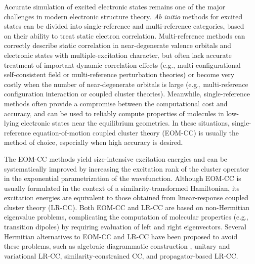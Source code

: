 Accurate simulation of excited electronic states remains one of the major
challenges in modern electronic structure theory. 
{\it Ab initio}\/ methods for excited states can be divided into
single-reference and multi-reference categories, based on their ability to
treat static electron correlation.
Multi-reference methods can correctly describe static correlation in
near-degenerate valence orbitals and electronic states with multiple-excitation
character, but often lack accurate treatment of important dynamic correlation
effects (e.g., multi-configurational self-consistent field or multi-reference
perturbation theories)
\cite{Knowles:1985p259,Werner:1985p5053,Wolinski:1987p225,Hirao:1992p374,Finley:1998p299,Andersson:1990p5483,Andersson:1992p1218,Werner:1996p645,Angeli:2001p10252,Angeli:2001p297}
or become very costly when the number of near-degenerate orbitals is large
(e.g., multi-reference configuration interaction or coupled cluster theories).
\cite{Mukherjee:1977p955,Lindgren:1978p33,Siegbahn:1980p1647,Jeziorski:1981p1668,Werner:1988p5803,Mahapatra:1998p157,Mahapatra:1999p6171,Pittner:2003p10876,Evangelista:2007p024102,Datta:2011p214116,Evangelista:2011p114102,Kohn:2013p176,Nooijen:2014p081102}
Meanwhile,
single-reference methods
\cite{Foresman:1992p135,Sherrill:1999p143,Geertsen:1989p57,Comeau:1993p414,Stanton:1993p7029,Krylov:2008p433,Crawford:2000p33,Shavitt:2009,Sekino:1984p255,Koch:1990p3345,Koch:1990p3333,Nooijen:1997p6441,Nooijen:1997p6812,Nakatsuji:1978p2053,Nakatsuji:1979p329}
often provide a compromise between the computational
cost and accuracy, and can be used to reliably compute properties of molecules
in low-lying electronic states near the equilibrium geometries. In these
situations, single-reference equation-of-motion coupled cluster theory
(EOM-CC)
\cite{Geertsen:1989p57,Comeau:1993p414,Stanton:1993p7029,Krylov:2008p433,Crawford:2000p33,Shavitt:2009}
is usually the method of choice, especially when high accuracy
is desired. 

The EOM-CC methods yield size-intensive excitation energies
\cite{Koch:1990p3345,Koch:1990p3333}
and can be
systematically improved by increasing the excitation rank of the cluster
operator in the exponential parametrization of the wavefunction. Although EOM-CC
is usually formulated in the context of a similarity-transformed Hamiltonian,
its excitation energies are equivalent to those obtained from linear-response
coupled cluster theory (LR-CC).
\cite{Sekino:1984p255,Koch:1990p3345,Koch:1990p3333}
Both EOM-CC and LR-CC are based on non-Hermitian eigenvalue problems,
complicating the computation of molecular properties (e.g., transition dipoles)
by requiring evaluation of left and right eigenvectors.
\cite{Stanton:1993p8840,Stanton:1994p4695,Stanton:1994p8938,Levchenko:2005p224106}
Several Hermitian alternatives to EOM-CC and LR-CC have been
proposed to avoid these problems, such as  
algebraic diagrammatic construction
\cite{Schirmer:1982p2395,Schirmer:1991p4647,Schirmer:2004p11449,Harbach:2014p064113,Dreuw:2014p82}, 
unitary and variational LR-CC,
\cite{Taube:2006p3393,Kats:2011p062503,Walz:2012p052519}
similarity-constrained CC,
\cite{Kjonstad:2017p4801}
and propagator-based LR-CC.
\cite{Moszynski:2005p1109,Korona:2010p14977}

